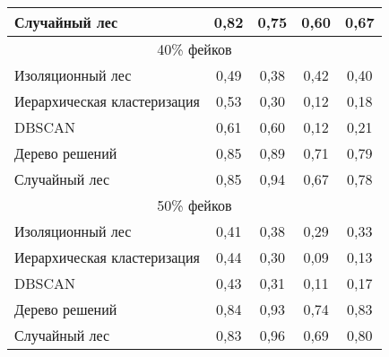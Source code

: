 \begin{table}[H]
\begin{tabular}{|lllll|}
    \multicolumn{1}{|l|}{Случайный лес} & \multicolumn{1}{c|}{0,82} & \multicolumn{1}{c|}{0,75} & \multicolumn{1}{c|}{0,60} & \multicolumn{1}{c|}{0,67} \\ \hline


    
    \multicolumn{5}{|c|}{40\% фейков} \\ \hline
    \multicolumn{1}{|l|}{Изоляционный лес} & \multicolumn{1}{c|}{0,49} & \multicolumn{1}{c|}{0,38} & \multicolumn{1}{c|}{0,42} & \multicolumn{1}{c|}{0,40} \\ \hline
    
    \multicolumn{1}{|l|}{Иерархическая кластеризация} & \multicolumn{1}{c|}{0,53} & \multicolumn{1}{c|}{0,30} & \multicolumn{1}{c|}{0,12} & \multicolumn{1}{c|}{0,18} \\ \hline
    
    \multicolumn{1}{|l|}{DBSCAN} & \multicolumn{1}{c|}{0,61} & \multicolumn{1}{c|}{0,60} & \multicolumn{1}{c|}{0,12} & \multicolumn{1}{c|}{0,21} \\ \hline

    \multicolumn{1}{|l|}{Дерево решений} & \multicolumn{1}{c|}{0,85} & \multicolumn{1}{c|}{0,89} & \multicolumn{1}{c|}{0,71} & \multicolumn{1}{c|}{0,79} \\ \hline
    
    \multicolumn{1}{|l|}{Случайный лес} & \multicolumn{1}{c|}{0,85} & \multicolumn{1}{c|}{0,94} & \multicolumn{1}{c|}{0,67} & \multicolumn{1}{c|}{0,78} \\ \hline


    
    \multicolumn{5}{|c|}{50\% фейков} \\ \hline
    \multicolumn{1}{|l|}{Изоляционный лес} & \multicolumn{1}{c|}{0,41} & \multicolumn{1}{c|}{0,38} & \multicolumn{1}{c|}{0,29} & \multicolumn{1}{c|}{0,33} \\ \hline
    
    \multicolumn{1}{|l|}{Иерархическая кластеризация} & \multicolumn{1}{c|}{0,44} & \multicolumn{1}{c|}{0,30} & \multicolumn{1}{c|}{0,09} & \multicolumn{1}{c|}{0,13} \\ \hline
    
    \multicolumn{1}{|l|}{DBSCAN} & \multicolumn{1}{c|}{0,43} & \multicolumn{1}{c|}{0,31} & \multicolumn{1}{c|}{0,11} & \multicolumn{1}{c|}{0,17} \\ \hline

    \multicolumn{1}{|l|}{Дерево решений} & \multicolumn{1}{c|}{0,84} & \multicolumn{1}{c|}{0,93} & \multicolumn{1}{c|}{0,74} & \multicolumn{1}{c|}{0,83} \\ \hline
    
    \multicolumn{1}{|l|}{Случайный лес} & \multicolumn{1}{c|}{0,83} & \multicolumn{1}{c|}{0,96} & \multicolumn{1}{c|}{0,69} & \multicolumn{1}{c|}{0,80} \\ \hline
    \end{tabular}
    \label{tabular:tableСomparison}
\end{table}

